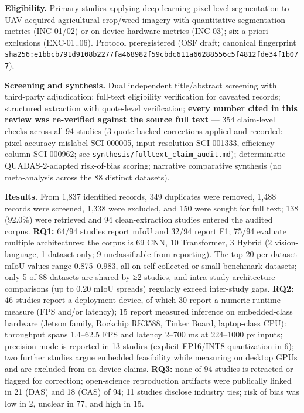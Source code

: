 \documentclass[11pt]{article}
\newcounter{none} %
\begin{document}
\textbf{Eligibility.} Primary studies applying deep-learning pixel-level
segmentation to UAV-acquired agricultural crop/weed imagery with
quantitative segmentation metrics (INC-01/02) or on-device hardware
metrics (INC-03); six a-priori exclusions (EXC-01..06). Protocol
preregistered (OSF draft; canonical fingerprint
\texttt{sha256:e1bbcb791d9108b2277fa468982f59cbdc611a66288556c5f4812fde34f1b077}).

\textbf{Screening and synthesis.} Dual independent title/abstract
screening with third-party adjudication; full-text eligibility
verification for caveated records; structured extraction with
quote-level verification; \textbf{every number cited in this review was
re-verified against the source full text} --- 354 claim-level checks
across all 94 studies (3 quote-backed corrections applied and recorded:
pixel-accuracy mislabel SCI-000005, input-resolution SCI-001333,
efficiency-column SCI-000962; see
\texttt{synthesis/fulltext\_claim\_audit.md}); deterministic
QUADAS-2-adapted risk-of-bias scoring; narrative comparative synthesis
(no meta-analysis across the 88 distinct datasets).

\textbf{Results.} From 1,837 identified records, 349 duplicates were
removed, 1,488 records were screened, 1,338 were excluded, and 150 were
sought for full text; 138 (92.0\%) were retrieved and 94
clean-extraction studies entered the audited corpus. \textbf{RQ1:} 64/94
studies report mIoU and 32/94 report F1; 75/94 evaluate multiple
architectures; the corpus is 69 CNN, 10 Transformer, 3 Hybrid (2
vision-language, 1 dataset-only; 9 unclassifiable from reporting). The
top-20 per-dataset mIoU values range 0.875--0.983, all on self-collected
or small benchmark datasets; only 5 of 88 datasets are shared by ≥2
studies, and intra-study architecture comparisons (up to 0.20 mIoU
spreads) regularly exceed inter-study gaps. \textbf{RQ2:} 46 studies
report a deployment device, of which 30 report a numeric runtime measure
(FPS and/or latency); 15 report measured inference on embedded-class
hardware (Jetson family, Rockchip RK3588, Tinker Board, laptop-class
CPU): throughput spans 1.4--62.5 FPS and latency 2--700 ms at 224--1000
px inputs; precision mode is reported in 13 studies (explicit FP16/INT8
quantization in 6); two further studies argue embedded feasibility while
measuring on desktop GPUs and are excluded from on-device claims.
\textbf{RQ3:} none of 94 studies is retracted or flagged for correction;
open-science reproduction artifacts were publically linked in 21 (DAS)
and 18 (CAS) of 94; 11 studies disclose industry ties; risk of bias was
low in 2, unclear in 77, and high in 15.
\end{document}
